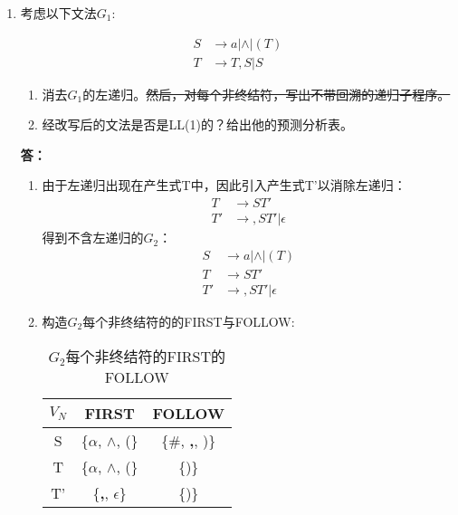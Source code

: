 \begin{enumerate}[1.]
    \item 考虑以下文法$G_1$:
    
        \begin{align*}
            S & \to a | \wedge | (T) \\
            T & \to T,S | S
        \end{align*}
        
        \begin{enumerate}[(1)]
            \item 消去$G_1$的左递归。\sout{然后，对每个非终结符，写出不带回溯的递归子程序。}
            \item 经改写后的文法是否是LL(1)的？给出他的预测分析表。
        \end{enumerate}
        
        \textbf{答：}
        
        \begin{enumerate}[(1)]
            \item
            由于左递归出现在产生式T中，因此引入产生式T'以消除左递归：
            \begin{align*}
                T & \to ST' \\
                T' & \to ,ST' | \epsilon
            \end{align*}
            得到不含左递归的$G_2$：
            \begin{align*}
                S & \to a | \wedge | (T) \\
                T & \to ST' \\
                T' & \to ,ST' | \epsilon
            \end{align*}
            
            \item
            构造$G_2$每个非终结符的的FIRST与FOLLOW:
            \begin{table}[H]
                \centering
                \begin{tabular}{|c|c|c|}
                    \hline
                    $V_N$ & FIRST & FOLLOW \\
                    \hline
                    S & \{$\alpha$, $\wedge$, (\} & \{\#, \textbf{,}, )\} \\
                    \hline
                    T & \{$\alpha$, $\wedge$, (\} & \{)\} \\
                    \hline
                    T' & \{\textbf{,}, $\epsilon$\} & \{)\} \\
                    \hline
                \end{tabular}
                \caption{$G_2$每个非终结符的FIRST的FOLLOW}
                \label{tab:G_2FF}
            \end{table}
            

\end{enumerate}
\end{enumerate}

